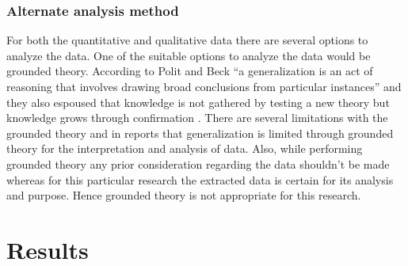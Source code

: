 \documentclass[a4paper,oneside]{bth}
\begin{document}
\subsection{Alternate analysis method}
For both the quantitative and qualitative data there are several options to analyze the data. One of the suitable options to analyze the data would be grounded theory. According to Polit and Beck \cite{hussein_using_2014} “a generalization is an act of reasoning that involves drawing broad conclusions from particular instances” and they also espoused that knowledge is not gathered by testing a new theory but knowledge grows through confirmation \cite{hussein_using_2014}. There are several limitations with the grounded theory and in \cite{hussein_using_2014} reports that generalization is limited through grounded theory for the interpretation and analysis of data. Also, while performing grounded theory any prior consideration regarding the data shouldn’t be made whereas for this particular research the extracted data is certain for its analysis and purpose. Hence grounded theory is not appropriate for this research.





\chapter{Results}
\end{document}

